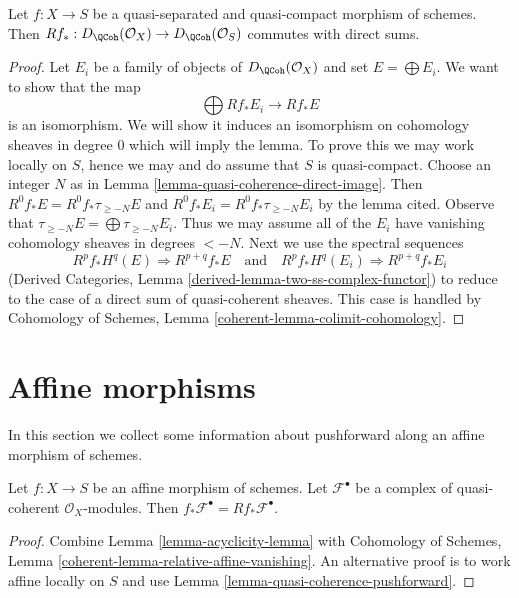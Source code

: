 \begin{lemma}
\label{lemma-quasi-coherence-pushforward-direct-sums}
Let $f : X \to S$ be a quasi-separated and quasi-compact morphism of
schemes. Then
$Rf_* : D_\QCoh(\mathcal{O}_X) \to D_\QCoh(\mathcal{O}_S)$
commutes with direct sums.
\end{lemma}

\begin{proof}
Let $E_i$ be a family of objects of $D_\QCoh(\mathcal{O}_X)$
and set $E = \bigoplus E_i$. We want to show that the map
$$
\bigoplus Rf_*E_i \longrightarrow Rf_*E
$$
is an isomorphism. We will show it induces an isomorphism on
cohomology sheaves in degree $0$ which will imply the lemma.
To prove this we may work locally on $S$, hence we may and do
assume that $S$ is quasi-compact.
Choose an integer $N$ as in Lemma \ref{lemma-quasi-coherence-direct-image}.
Then $R^0f_*E = R^0f_*\tau_{\geq -N}E$ and
$R^0f_*E_i = R^0f_*\tau_{\geq -N}E_i$ by the lemma cited. Observe that
$\tau_{\geq -N}E = \bigoplus \tau_{\geq -N}E_i$.
Thus we may assume all of the $E_i$ have vanishing cohomology
sheaves in degrees $< -N$. Next we use the spectral sequences
$$
R^pf_*H^q(E) \Rightarrow R^{p + q}f_*E
\quad\text{and}\quad
R^pf_*H^q(E_i) \Rightarrow R^{p + q}f_*E_i
$$
(Derived Categories, Lemma \ref{derived-lemma-two-ss-complex-functor})
to reduce to the case of a direct sum of quasi-coherent sheaves.
This case is handled by
Cohomology of Schemes, Lemma \ref{coherent-lemma-colimit-cohomology}.
\end{proof}









\section{Affine morphisms}
\label{section-affine-morphisms}

\noindent
In this section we collect some information about pushforward
along an affine morphism of schemes.

\begin{lemma}
\label{lemma-pushforward-affine-morphism}
Let $f : X \to S$ be an affine morphism of schemes. Let $\mathcal{F}^\bullet$
be a complex of quasi-coherent $\mathcal{O}_X$-modules. Then
$f_*\mathcal{F}^\bullet = Rf_*\mathcal{F}^\bullet$.
\end{lemma}

\begin{proof}
Combine Lemma \ref{lemma-acyclicity-lemma} with
Cohomology of Schemes, Lemma \ref{coherent-lemma-relative-affine-vanishing}.
An alternative proof is to work affine locally on $S$
and use Lemma \ref{lemma-quasi-coherence-pushforward}.
\end{proof}

